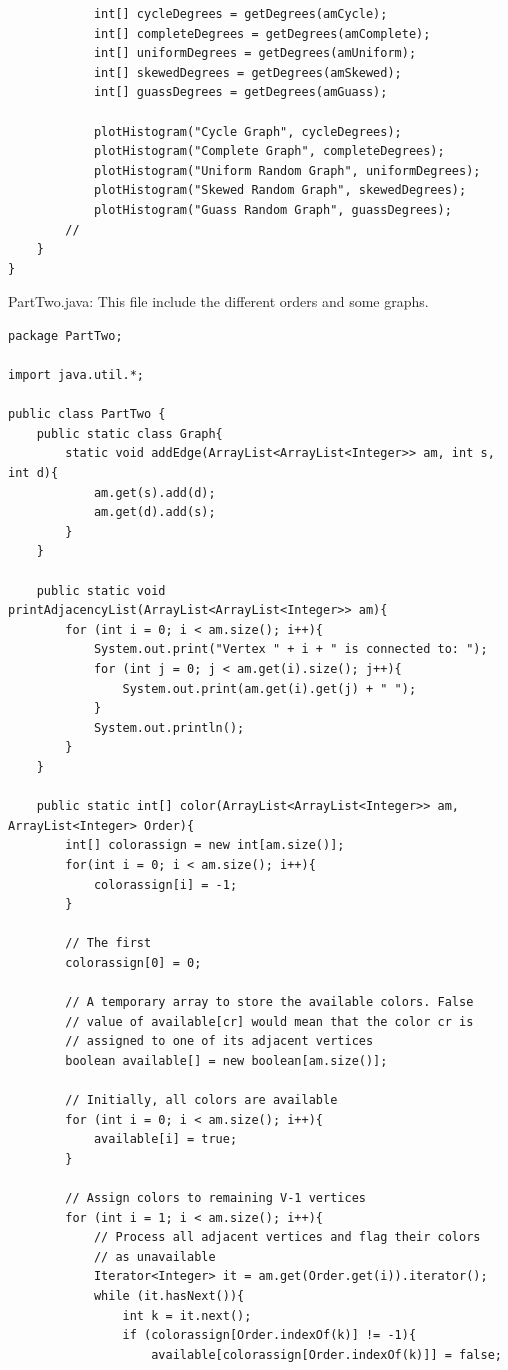 \documentclass{article}
\begin{document}
\begin{verbatim}
            int[] cycleDegrees = getDegrees(amCycle);
            int[] completeDegrees = getDegrees(amComplete);
            int[] uniformDegrees = getDegrees(amUniform);
            int[] skewedDegrees = getDegrees(amSkewed);
            int[] guassDegrees = getDegrees(amGuass);

            plotHistogram("Cycle Graph", cycleDegrees);
            plotHistogram("Complete Graph", completeDegrees);
            plotHistogram("Uniform Random Graph", uniformDegrees);
            plotHistogram("Skewed Random Graph", skewedDegrees);
            plotHistogram("Guass Random Graph", guassDegrees);
        //
    }
}

\end{verbatim}

PartTwo.java: This file include the different orders and some graphs. 
\begin{verbatim}
package PartTwo;

import java.util.*;

public class PartTwo {
    public static class Graph{
        static void addEdge(ArrayList<ArrayList<Integer>> am, int s, int d){
            am.get(s).add(d);
            am.get(d).add(s);
        }
    }

    public static void printAdjacencyList(ArrayList<ArrayList<Integer>> am){
        for (int i = 0; i < am.size(); i++){
            System.out.print("Vertex " + i + " is connected to: ");
            for (int j = 0; j < am.get(i).size(); j++){
                System.out.print(am.get(i).get(j) + " ");
            }
            System.out.println();
        }
    }

    public static int[] color(ArrayList<ArrayList<Integer>> am, ArrayList<Integer> Order){
        int[] colorassign = new int[am.size()];
        for(int i = 0; i < am.size(); i++){
            colorassign[i] = -1;
        }

        // The first
        colorassign[0] = 0;

        // A temporary array to store the available colors. False
        // value of available[cr] would mean that the color cr is
        // assigned to one of its adjacent vertices
        boolean available[] = new boolean[am.size()];

        // Initially, all colors are available
        for (int i = 0; i < am.size(); i++){
            available[i] = true;
        }

        // Assign colors to remaining V-1 vertices
        for (int i = 1; i < am.size(); i++){
            // Process all adjacent vertices and flag their colors
            // as unavailable
            Iterator<Integer> it = am.get(Order.get(i)).iterator();
            while (it.hasNext()){
                int k = it.next();
                if (colorassign[Order.indexOf(k)] != -1){
                    available[colorassign[Order.indexOf(k)]] = false;


\end{verbatim}
\end{document}
